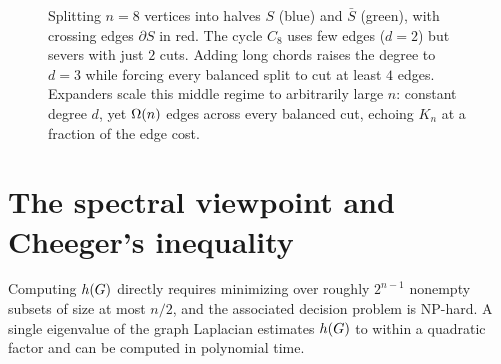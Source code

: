 \begin{figure}[htbp]
\caption{Splitting $n=8$ vertices into halves $S$ (blue) and $\bar S$ (green), with crossing edges $\partial S$ in red. The cycle $C_8$ uses few edges ($d=2$) but severs with just $2$ cuts. Adding long chords raises the degree to $d=3$ while forcing every balanced split to cut at least $4$ edges. Expanders scale this middle regime to arbitrarily large $n$: constant degree $d$, yet $\Omega(n)$ edges across every balanced cut, echoing $K_n$ at a fraction of the edge cost.}
\label{ch34:fig-extremes}
\end{figure}

\section{The spectral viewpoint and Cheeger's inequality}
\label{ch34:spectral}

Computing $h(G)$ directly requires minimizing over roughly $2^{n-1}$ nonempty subsets of size at most $n/2$, and the associated decision problem is NP-hard. A single eigenvalue of the graph Laplacian estimates $h(G)$ to within a quadratic factor and can be computed in polynomial time.

